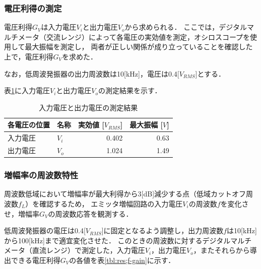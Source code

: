 \documentclass[dvipdfmx,titlepage,a4j]{jsarticle}  %
\numberwithin{equation}{section}
\begin{document}
\subsubsection{電圧利得の測定}
電圧利得$G_V$は入力電圧$V_i$と出力電圧$V_o$から求められる．
ここでは，デジタルマルチメータ（交流レンジ）によって各電圧の実効値を測定，オシロスコープを使用して最大振幅を測定し，
両者が正しい関係が成り立っていることを確認した上で，電圧利得$G_V$を求めた．

なお，低周波発振器の出力周波数は10[kHz]，電圧は0.4[$V_{RMS}$]とする．

表\ref{tbl:res;gain}に入力電圧$V_i$と出力電圧$V_o$の測定結果を示す．
\begin{table}[H]
  \caption{入力電圧と出力電圧の測定結果}
  \begin{center}
    \begin{tabular}{l|l|r|r}
      \hline
      各電圧の位置 & 名称  & \multicolumn{1}{l|}{実効値 [$V_{RMS}$]} & \multicolumn{1}{l}{最大振幅 [$V$]} \\ \hline\hline
      入力電圧     & $V_i$ & 0.402                                   & 0.63                               \\ \hline
      出力電圧     & $V_o$ & 1.024                                   & 1.49                               \\ \hline
    \end{tabular}
  \end{center}
  \label{tbl:res;gain}
\end{table}

\subsubsection{増幅率の周波数特性}
周波数低域において増幅率が最大利得から3[dB]減少する点（低域カットオフ周波数$f_L$）を確認するため，
エミッタ増幅回路の入力電圧$V_i$の周波数$f$を変化させ，増幅率$G_V$の周波数応答を観測する．

低周波発振器の電圧は0.4[$V_{RMS}$]に固定となるよう調整し，出力周波数$f$は10[kHz]から100[kHz]まで適宜変化させた．
このときの周波数に対するデジタルマルチメータ（直流レンジ）で測定した，入力電圧$V_i$，出力電圧$V_o$，またそれらから導出できる電圧利得$G_V$の各値を表\ref{tbl:res;f-gain}に示す．
\end{document}
